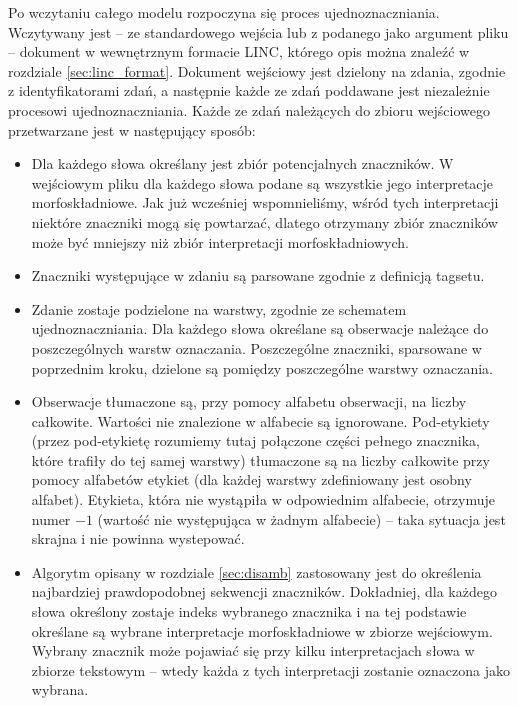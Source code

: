 \documentclass[a4paper,10]{article}
\newcommand{\comment}[2]{\noindent{{\scriptsize\sffamily(\marginpar{\sffamily #1}#2)}}}
\newcommand{\jw}[1]{\comment{\tiny{JW}}{\textcolor{blue}{#1}}}
\begin{document}
Po wczytaniu całego modelu rozpoczyna się proces ujednoznaczniania.
Wczytywany jest -- ze standardowego wejścia lub z podanego jako argument
pliku -- dokument w wewnętrznym formacie LINC, którego opis można znaleźć
w rozdziale \ref{sec:linc_format}.
Dokument wejściowy jest dzielony na zdania, zgodnie z identyfikatorami zdań,
a następnie każde ze zdań poddawane jest niezależnie procesowi
ujednoznaczniania.
Każde ze zdań należących do zbioru wejściowego przetwarzane jest w następujący sposób:
\begin{itemize}
\item Dla każdego słowa określany jest zbiór potencjalnych znaczników.
  W wejściowym pliku dla każdego słowa podane są
  wszystkie jego interpretacje morfoskładniowe. Jak już wcześniej
  wspomnieliśmy, wśród tych interpretacji niektóre znaczniki mogą
  się powtarzać, dlatego otrzymany zbiór znaczników może być mniejszy
  niż zbiór interpretacji morfoskładniowych.
\item Znaczniki występujące w zdaniu są parsowane zgodnie
  z definicją tagsetu.
\item Zdanie zostaje podzielone na warstwy, zgodnie ze schematem ujednoznaczniania.
  Dla każdego słowa określane są obserwacje należące do poszczególnych
  warstw oznaczania.
  Poszczególne znaczniki, sparsowane w poprzednim kroku, dzielone są pomiędzy
  poszczególne warstwy oznaczania.
\item Obserwacje tłumaczone są, przy pomocy alfabetu obserwacji, na liczby całkowite.
  Wartości nie znalezione w alfabecie są ignorowane.
  Pod-etykiety (przez pod-etykietę rozumiemy tutaj połączone części pełnego znacznika,
  które trafiły do tej samej warstwy) tłumaczone są na
  liczby całkowite przy pomocy alfabetów etykiet (dla każdej warstwy zdefiniowany
  jest osobny alfabet).
  Etykieta, która nie wystąpiła w odpowiednim alfabecie, otrzymuje numer
  $-1$ (wartość nie występująca w żadnym alfabecie) -- taka sytuacja jest skrajna
  i nie powinna wystepować.
\item Algorytm opisany w rozdziale \ref{sec:disamb} zastosowany jest do
  określenia najbardziej prawdopodobnej sekwencji znaczników. Dokładniej,
  dla każdego słowa określony zostaje indeks wybranego znacznika i na tej
  podstawie określane są wybrane interpretacje morfoskładniowe w zbiorze
  wejściowym. Wybrany znacznik może pojawiać się
  przy kilku interpretacjach słowa w zbiorze tekstowym -- wtedy każda
  z tych interpretacji zostanie oznaczona jako wybrana.
\end{itemize}
\end{document}
